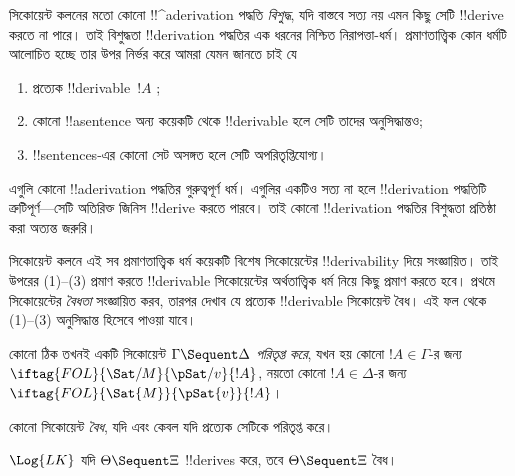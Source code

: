 \documentclass[../../../include/open-logic-section]{subfiles}
\begin{document}
      {}
      {}


\begin{explain}
সিকোয়েন্ট কলনের মতো কোনো !!^a{derivation} পদ্ধতি \emph{বিশুদ্ধ}, যদি
বাস্তবে সত্য নয় এমন কিছু সেটি !!{derive} করতে না পারে। তাই বিশুদ্ধতা
!!{derivation} পদ্ধতির এক ধরনের নিশ্চিত নিরাপত্তা-ধর্ম। প্রমাণতাত্ত্বিক
কোন ধর্মটি আলোচিত হচ্ছে তার উপর নির্ভর করে আমরা যেমন জানতে চাই যে
\begin{enumerate}
\item প্রত্যেক !!{derivable}~$!A$ ;
\item কোনো !!a{sentence} অন্য কয়েকটি থেকে !!{derivable} হলে সেটি
  তাদের অনুসিদ্ধান্তও;
\item !!{sentence}s-এর কোনো সেট অসঙ্গত হলে সেটি অপরিতৃপ্তিযোগ্য।
\end{enumerate}
এগুলি কোনো !!a{derivation} পদ্ধতির গুরুত্বপূর্ণ ধর্ম। এগুলির একটিও সত্য
না হলে !!{derivation} পদ্ধতিটি ত্রুটিপূর্ণ—সেটি অতিরিক্ত জিনিস
!!{derive} করতে পারবে। তাই কোনো !!{derivation} পদ্ধতির বিশুদ্ধতা
প্রতিষ্ঠা করা অত্যন্ত জরুরি।

সিকোয়েন্ট কলনে এই সব প্রমাণতাত্ত্বিক ধর্ম কয়েকটি বিশেষ সিকোয়েন্টের
!!{derivability} দিয়ে সংজ্ঞায়িত। তাই উপরের (1)--(3) প্রমাণ করতে
!!{derivable} সিকোয়েন্টের অর্থতাত্ত্বিক ধর্ম নিয়ে কিছু প্রমাণ করতে হবে।
প্রথমে সিকোয়েন্টের \emph{বৈধতা} সংজ্ঞায়িত করব, তারপর দেখাব যে প্রত্যেক
!!{derivable} সিকোয়েন্ট বৈধ। এই ফল থেকে (1)--(3) অনুসিদ্ধান্ত হিসেবে
পাওয়া যাবে।
\end{explain}

\begin{defn}
কোনো  ঠিক তখনই একটি সিকোয়েন্ট
$\Gamma \Sequent \Delta$ \emph{পরিতৃপ্ত করে}, যখন হয় কোনো
$!A \in \Gamma$-র জন্য $\iftag{FOL}{\Sat/{M}}{\pSat/{v}}{!A}$, নয়তো
কোনো $!A \in \Delta$-র জন্য $\iftag{FOL}{\Sat{M}}{\pSat{v}}{!A}$।

কোনো সিকোয়েন্ট \emph{বৈধ}, যদি এবং কেবল যদি প্রত্যেক
 সেটিকে পরিতৃপ্ত করে।
\end{defn}

\begin{thm}[বিশুদ্ধতা]
 $\Log{LK}$ যদি $\Theta
\Sequent \Xi$ !!{derive}s করে, তবে $\Theta \Sequent \Xi$ বৈধ।
\end{thm}
\end{document}
